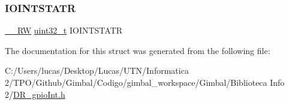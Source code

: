 \mbox{\label{struct_i_o_int__t_a63882d661630553c94d27113657ed420}} 
\subsubsection{\texorpdfstring{IOINTSTATR}{IOINTSTATR}}
{\footnotesize\ttfamily \mbox{\hyperlink{_d_r__tipos_8h_a81f369079976a46554fd9798ab035697}{\+\_\+\+\_\+\+RW}} \mbox{\hyperlink{_d_r__tipos_8h_a435d1572bf3f880d55459d9805097f62}{uint32\+\_\+t}} I\+O\+I\+N\+T\+S\+T\+A\+TR}



The documentation for this struct was generated from the following file\+:\begin{DoxyCompactItemize}
\item 
C\+:/\+Users/lucas/\+Desktop/\+Lucas/\+U\+T\+N/\+Informatica 2/\+T\+P\+O/\+Github/\+Gimbal/\+Codigo/gimbal\+\_\+workspace/\+Gimbal/\+Biblioteca Info 2/\mbox{\hyperlink{_d_r__gpio_int_8h}{D\+R\+\_\+gpio\+Int.\+h}}\end{DoxyCompactItemize}
